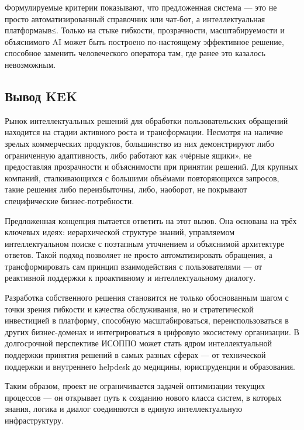 Формулируемые критерии показывают, что предложенная система — это не просто автоматизированный справочник или чат-бот, а интеллектуальная платформаыв≤. Только на стыке гибкости, прозрачности, масштабируемости и объяснимого AI может быть построено по-настоящему эффективное решение, способное заменить человеческого оператора там, где ранее это казалось невозможным.

\subsection{Вывод KEK}

Рынок интеллектуальных решений для обработки пользовательских обращений находится на стадии активного роста и трансформации. Несмотря на наличие зрелых коммерческих продуктов, большинство из них демонстрируют либо ограниченную адаптивность, либо работают как «чёрные ящики», не предоставляя прозрачности и объяснимости при принятии решений. Для крупных компаний, сталкивающихся с большими объёмами повторяющихся запросов, такие решения либо переизбыточны, либо, наоборот, не покрывают специфические бизнес-потребности.

Предложенная концепция пытается ответить на этот вызов. Она основана на трёх ключевых идеях: иерархической структуре знаний, управляемом интеллектуальном поиске с поэтапным уточнением и объяснимой архитектуре ответов. Такой подход позволяет не просто автоматизировать обращения, а трансформировать сам принцип взаимодействия с пользователями — от реактивной поддержки к проактивному и интеллектуальному диалогу.

Разработка собственного решения становится не только обоснованным шагом с точки зрения гибкости и качества обслуживания, но и стратегической инвестицией в платформу, способную масштабироваться, переиспользоваться в других бизнес-доменах и интегрироваться в цифровую экосистему организации. В долгосрочной перспективе ИСОППО может стать ядром интеллектуальной поддержки принятия решений в самых разных сферах — от технической поддержки и внутреннего helpdesk до медицины, юриспруденции и образования.

Таким образом, проект не ограничивается задачей оптимизации текущих процессов — он открывает путь к созданию нового класса систем, в которых знания, логика и диалог соединяются в единую интеллектуальную инфраструктуру.
